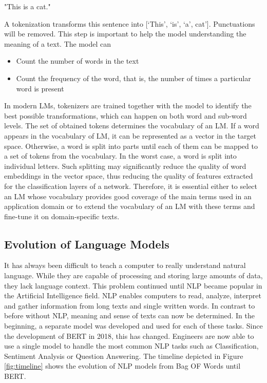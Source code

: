\centerline{"This is a cat."} 

A tokenization transforms this sentence into [‘This’, ‘is’, ‘a’, cat’]. Punctuations will be removed. This step is important to help the model understanding the meaning of a text. The model can
\begin{itemize}
	\item Count the number of words in the text
	\item Count the frequency of the word, that is, the number of times a particular word is present
\end{itemize} 

In modern LMs, tokenizers are trained together with the model to identify the best possible transformations, which can happen on both word and sub-word levels. The set of obtained tokens determines the vocabulary of an LM. If a word appears in the vocabulary of LM, it can be represented as a vector in the target space. Otherwise, a word is split into parts until each of them can be mapped to a set of tokens from the vocabulary. In the worst case, a word is split into individual letters. Such splitting may significantly reduce the quality of word embeddings in the vector space, thus reducing the quality of features extracted for the classification layers of a network. Therefore, it is essential either to select an LM whose vocabulary provides good coverage of the main terms used in an application domain or to extend the vocabulary of an LM with these terms and fine-tune it on domain-specific texts. 

\subsection{Evolution of Language Models}
It has always been difficult to teach a computer to really understand natural language. While they are capable of processing and storing large amounts of data, they lack language context. This problem continued until NLP became popular in the Artificial Intelligence field. NLP enables computers to read, analyze, interpret and gather information from long texts and single written words. In contrast to before without NLP, meaning and sense of texts can now be determined. In the beginning, a separate model was developed and used for each of these tasks. Since the development of BERT in 2018, this has changed. Engineers are now able to use a single model to handle the most common NLP tasks such as Classification, Sentiment Analysis or Question Answering. The timeline depicted in Figure \ref{fig:timeline} shows the evolution of NLP models from \alert{Bag OF Words} until \alert{BERT}.

